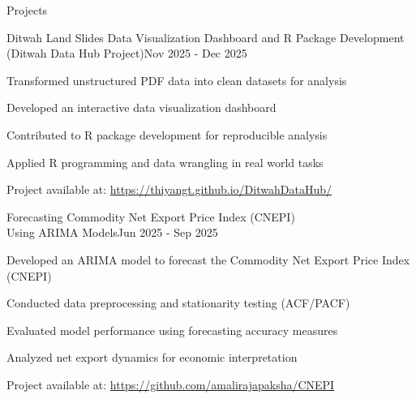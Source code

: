 \documentclass{resume} %
\begin{document}
	\begin{rSection}{Projects} 
		
		\begin{rSubsection}{Ditwah Land Slides Data Visualization Dashboard and R Package Development \\ (Ditwah Data Hub Project)}{Nov 2025 - Dec 2025}{}{}
			\item Transformed unstructured PDF data into clean datasets for analysis
			\item Developed an interactive data visualization dashboard
			\item Contributed to R package development for reproducible analysis
			\item Applied R programming and data wrangling in real world tasks
		\end{rSubsection}
		\vspace{-0.3 cm}
		\item Project available at: \href{https://thiyangt.github.io/DitwahDataHub/}{https://thiyangt.github.io/DitwahDataHub/}
		
		\vspace{0.7 cm}
		
		\begin{rSubsection}{Forecasting Commodity Net Export Price Index (CNEPI) \\ Using ARIMA Models}{Jun 2025 - Sep 2025}{}{}
			\item Developed an ARIMA model to forecast the Commodity Net Export Price Index (CNEPI)
			\item Conducted data preprocessing and stationarity testing (ACF/PACF)
			\item Evaluated model performance using forecasting accuracy measures
			\item Analyzed net export dynamics for economic interpretation
		\end{rSubsection}
		\vspace{-0.3 cm}
		\item Project available at: \href{https://github.com/amalirajapaksha/CNEPI}{https://github.com/amalirajapaksha/CNEPI}
		
		\vspace{0.7 cm}
		

\end{rSection}
\end{document}
